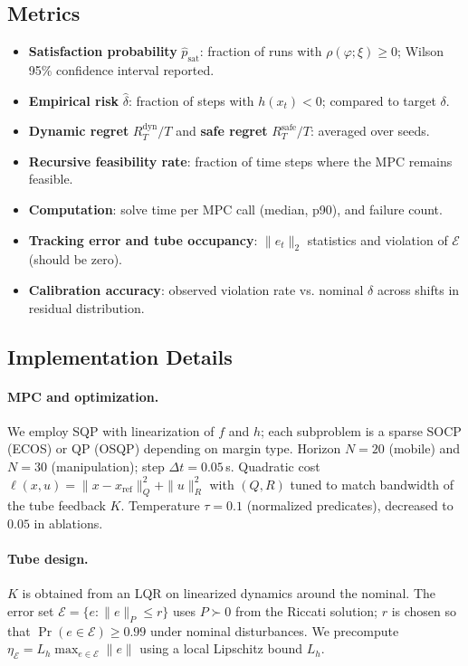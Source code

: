 \documentclass[journal]{IEEEtran}
\theoremstyle{definition}
\begin{document}
\subsection{Metrics}
\begin{itemize}
\item \textbf{Satisfaction probability} $\widehat{p}_{\mathrm{sat}}$:
fraction of runs with $\rho(\varphi;\xi)\ge 0$; Wilson 95\% confidence interval reported.
\item \textbf{Empirical risk} $\widehat{\delta}$:
fraction of steps with $h(x_t)<0$; compared to target $\delta$.
\item \textbf{Dynamic regret} $R_T^{\mathrm{dyn}}/T$ and \textbf{safe regret} $R_T^{\mathrm{safe}}/T$:
averaged over seeds.
\item \textbf{Recursive feasibility rate}:
fraction of time steps where the MPC remains feasible.
\item \textbf{Computation}:
solve time per MPC call (median, p90), and failure count.
\item \textbf{Tracking error and tube occupancy}:
$\|e_t\|_2$ statistics and violation of $\mathcal{E}$ (should be zero).
\item \textbf{Calibration accuracy}:
observed violation rate vs. nominal $\delta$ across shifts in residual distribution.
\end{itemize}

\subsection{Implementation Details}
\paragraph*{MPC and optimization.}
We employ SQP with linearization of $f$ and $h$; each subproblem is a sparse SOCP (ECOS) or QP (OSQP) depending on margin type.
Horizon $N=20$ (mobile) and $N=30$ (manipulation); step $\Delta t=0.05$\,s.
Quadratic cost $\ell(x,u)=\|x-x_{\mathrm{ref}}\|_Q^2+\|u\|_R^2$ with $(Q,R)$ tuned to match bandwidth of the tube feedback $K$.
Temperature $\tau=0.1$ (normalized predicates), decreased to $0.05$ in ablations.

\paragraph*{Tube design.}
$K$ is obtained from an LQR on linearized dynamics around the nominal.
The error set $\mathcal{E}=\{e:\|e\|_{P}\le r\}$ uses $P\succ0$ from the Riccati solution; $r$ is chosen so that
$\Pr(e\in\mathcal{E})\ge 0.99$ under nominal disturbances.
We precompute $\eta_{\mathcal{E}}=L_h \max_{e\in\mathcal{E}}\|e\|$ using a local Lipschitz bound $L_h$.
\end{document}
